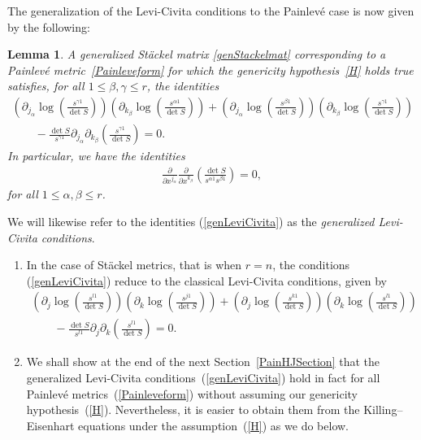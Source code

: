 \documentclass[11pt]{article}
\numberwithin{equation}{section}
\newtheorem{Lemma}[Theorem]{Lemma}
\newcommand{\jalpha}{j_{\alpha}}
\newcommand{\kbeta}{k_{\beta}}
\begin{document}
The generalization of the Levi-Civita conditions to the Painlev\'e case is now given by the following:
\begin{Lemma} \label{LeviCivita}
A generalized St\"ackel matrix \eqref{genStackelmat} corresponding to a Painlev\'e metric~\eqref{Painleveform} for which the genericity hypothesis~\eqref{H} holds true satisfies, for all $1\leq \beta, \gamma \leq r$,
the identities
\begin{gather}
\left(\partial_{\jalpha}\log\left(\frac{s^{\gamma 1}}{\det S}\right)\right) \left(\partial_{\kbeta}\log\left(\frac{s^{\alpha 1}}{\det S}\right)\right)+\left(\partial_{\jalpha}\log\left(\frac{s^{\beta 1}}{\det S}\right)\right)\left(\partial_{\kbeta}\log\left(\frac{s^{\gamma 1}}{\det S}\right)\right)\nonumber\\
\qquad{} -\frac{\det S}{s^{\gamma 1}}\partial_{\jalpha}\partial_{\kbeta}\left(\frac{s^{\gamma 1}}{\det S}\right)=0.\label{genLeviCivita}
\end{gather}
In particular, we have the identities
\begin{gather}\label{secondorder}
\frac{\partial}{\partial x^{\jalpha}}\frac{\partial }{\partial x^{\kbeta}}\left(\frac{\det S}{s^{\alpha1}s^{\beta1}}\right)=0,
\end{gather}
for all
$1\leq \alpha, \beta \leq r$.
\end{Lemma}
We will likewise refer to the identities (\ref{genLeviCivita}) as the {\emph{generalized Levi-Civita conditions}}.
\begin{Remark}\quad
\begin{enumerate}\itemsep=0pt
\item[1)] In the case of St\"ackel metrics, that is when $r=n$, the conditions (\ref{genLeviCivita}) reduce to the classical Levi-Civita conditions, given by
\begin{gather*}
\left(\partial_{j}\log\left(\frac{s^{l1}}{\det S}\right)\right)\left(\partial_{k}\log\left(\frac{s^{j1}}{\det S}\right)\right)+\left(\partial_{j}\log\left(\frac{s^{k1}}{\det S}\right)\right)\left(\partial_{k}\log \left(\frac{s^{l1}}{\det S}\right)\right)\\
\qquad{} -\frac{\det S}{s^{l1}}\partial_{j}\partial_{k}\left(\frac{s^{l1}}{\det S}\right)=0.
\end{gather*}
\item[2)] We shall show at the end of the next Section~\ref{PainHJSection} that the generalized Levi-Civita condi\-tions~(\ref{genLeviCivita}) hold in fact for all Painlev\'e metrics~(\ref{Painleveform}) without assuming our genericity hypothesis~(\ref{H}). Nevertheless, it is easier to obtain them from the Killing--Eisenhart equations under the assumption~(\ref{H}) as we do below.
\end{enumerate}
\end{Remark}
\end{document}
